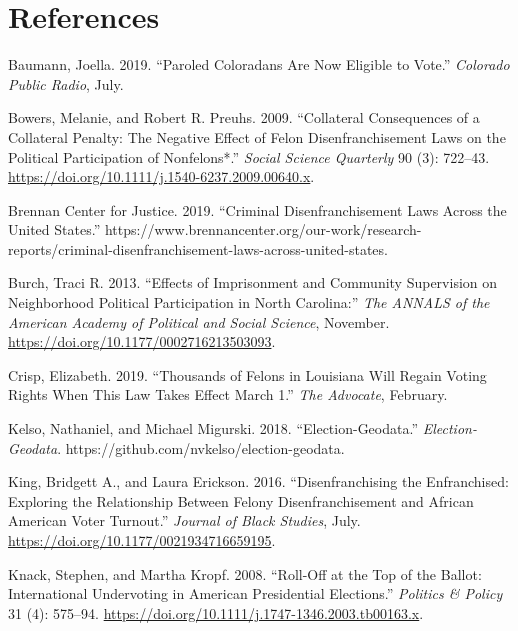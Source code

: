 \documentclass[
  12pt,
]{article}
\newlength{\cslhangindent}
\newenvironment{cslreferences}%
  {\setlength{\parindent}{0pt}%
  \everypar{\setlength{\hangindent}{\cslhangindent}}\ignorespaces}%
  {\par}
\begin{document}
\newpage

\hypertarget{references}{%
\section*{References}\label{references}}

\hypertarget{refs}{}
\begin{cslreferences}
\leavevmode\hypertarget{ref-Baumann2019}{}%
Baumann, Joella. 2019. ``Paroled Coloradans Are Now Eligible to Vote.'' \emph{Colorado Public Radio}, July.

\leavevmode\hypertarget{ref-Bowers2009}{}%
Bowers, Melanie, and Robert R. Preuhs. 2009. ``Collateral Consequences of a Collateral Penalty: The Negative Effect of Felon Disenfranchisement Laws on the Political Participation of Nonfelons*.'' \emph{Social Science Quarterly} 90 (3): 722--43. \url{https://doi.org/10.1111/j.1540-6237.2009.00640.x}.

\leavevmode\hypertarget{ref-bcj_laws}{}%
Brennan Center for Justice. 2019. ``Criminal Disenfranchisement Laws Across the United States.'' https://www.brennancenter.org/our-work/research-reports/criminal-disenfranchisement-laws-across-united-states.

\leavevmode\hypertarget{ref-Burch2013}{}%
Burch, Traci R. 2013. ``Effects of Imprisonment and Community Supervision on Neighborhood Political Participation in North Carolina:'' \emph{The ANNALS of the American Academy of Political and Social Science}, November. \url{https://doi.org/10.1177/0002716213503093}.

\leavevmode\hypertarget{ref-Crisp2019}{}%
Crisp, Elizabeth. 2019. ``Thousands of Felons in Louisiana Will Regain Voting Rights When This Law Takes Effect March 1.'' \emph{The Advocate}, February.

\leavevmode\hypertarget{ref-Kelso2018}{}%
Kelso, Nathaniel, and Michael Migurski. 2018. ``Election-Geodata.'' \emph{Election-Geodata}. https://github.com/nvkelso/election-geodata.

\leavevmode\hypertarget{ref-King2016}{}%
King, Bridgett A., and Laura Erickson. 2016. ``Disenfranchising the Enfranchised: Exploring the Relationship Between Felony Disenfranchisement and African American Voter Turnout.'' \emph{Journal of Black Studies}, July. \url{https://doi.org/10.1177/0021934716659195}.

\leavevmode\hypertarget{ref-Knack2008}{}%
Knack, Stephen, and Martha Kropf. 2008. ``Roll-Off at the Top of the Ballot: International Undervoting in American Presidential Elections.'' \emph{Politics \& Policy} 31 (4): 575--94. \url{https://doi.org/10.1111/j.1747-1346.2003.tb00163.x}.


\end{cslreferences}
\end{document}
